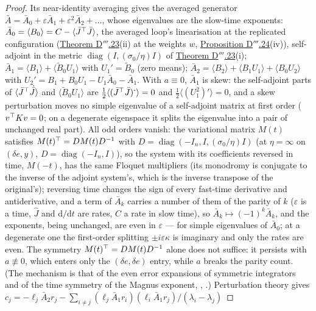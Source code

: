 \begin{proof}
Its near-identity averaging gives the averaged generator
$\bar A = \bar A_0 + \varepsilon\bar A_1 + \varepsilon^2\bar A_2 + \dots$, whose eigenvalues are the slow-time
exponents: $\bar A_0 = \langle B_0\rangle = C - \langle\bar J^\top\bar J\rangle$, the averaged loop's linearisation at
the replicated configuration (\hyperref[res:thmDppp:23]{Theorem D$'''$.23}(ii) at the weights $w$,
\hyperref[res:thmDppp:24]{Proposition D$'''$.24}(iv)), self-adjoint in the metric
$\operatorname{diag}(I,(\sigma_0/\eta)I)$ of \hyperref[res:thmDppp:23]{Theorem D$'''$.23}(i);
$\bar A_1 = \langle B_1\rangle + \langle\tilde B_0U_1\rangle$ with $U_1' = \tilde B_0$ (zero means);
$\bar A_2 = \langle B_2\rangle + \langle B_1U_1\rangle + \langle B_0U_2\rangle$ with
$U_2' = B_1 + B_0U_1 - U_1\bar A_0 - \bar A_1$. With $a\equiv0$, $\bar A_1$ is skew: the self-adjoint parts of
$\langle\bar J^\top\dot{\bar J}\rangle$ and $\langle\tilde B_0U_1\rangle$ are
$\frac12\langle(\bar J^\top\bar J)^{\boldsymbol\cdot}\rangle = 0$ and $\frac12\langle(U_1^2)'\rangle = 0$, and a skew
perturbation moves no simple eigenvalue of a self-adjoint matrix at first order ($v^\top Kv = 0$; on a degenerate
eigenspace it splits the eigenvalue into a pair of unchanged real part). All odd orders vanish: the variational
matrix $M(t)$ satisfies $M(t)^\top = DM(t)D^{-1}$ with $D = \operatorname{diag}(-I_n,I,(\sigma_0/\eta)I)$ (at
$\eta = \infty$ on $(\delta e,y)$, $D = \operatorname{diag}(-I_n,I)$), so the system with its coefficients reversed in
time, $M(-t)$, has the same Floquet multipliers (its monodromy is conjugate to the inverse of the adjoint system's,
which is the inverse transpose of the original's); reversing time changes the sign of every fast-time derivative and
antiderivative, and a term of $\bar A_k$ carries a number of them of the parity of $k$ ($\varepsilon$ is a time,
$\hat J$ and $\mathrm{d}/\mathrm{d}t$ are rates, $C$ a rate in slow time), so $\bar A_k\mapsto(-1)^k\bar A_k$, and the
exponents, being unchanged, are even in $\varepsilon$ --- for simple eigenvalues of $\bar A_0$; at a degenerate one
the first-order splitting $\pm i\varepsilon\kappa$ is imaginary and only the rates are even. The symmetry
$M(t)^\top = DM(t)D^{-1}$ alone does not suffice: it persists with $a\not\equiv0$, which enters only the
$(\delta e,\delta e)$ entry, while $a$ breaks the parity count. (The mechanism is that of the even error expansions of
symmetric integrators and of the time symmetry of the Magnus exponent, \cite{S56}, \cite{S52}.) Perturbation theory
gives $c_j = -\ell_j\bar A_2r_j - \sum_{i\ne j}(\ell_j\bar A_1r_i)(\ell_i\bar A_1r_j)/(\lambda_i - \lambda_j)$

\end{proof}
